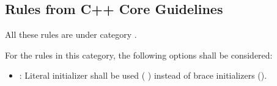 \subsection{Rules from C++ Core Guidelines}

All these rules are under category
.

For the rules in this category, the following options shall be considered:

\begin{itemize}

\item {}:
Literal initializer shall be used ( )
instead of brace initializers ().

\end{itemize}
